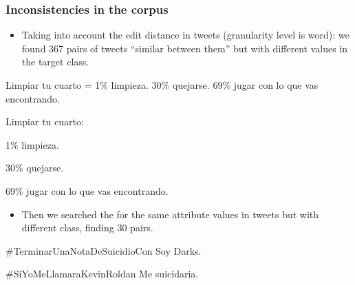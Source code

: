 \begin{frame}[allowframebreaks]
    \frametitle{Inconsistencies in the corpus}

    \begin{itemize}
        \item Taking into account the edit distance in tweets (granularity level is word): we found 367 pairs of tweets ``similar between them'' but with different values in the target class.
    \end{itemize}

    \begin{example}
        Limpiar tu cuarto = 1\% limpieza. 30\% quejarse. 69\% jugar con lo que vas encontrando.
    \end{example}

    \begin{example}
        Limpiar tu cuarto:

        1\% limpieza.

        30\% quejarse.

        69\% jugar con lo que vas encontrando.
    \end{example}

    \framebreak{}

    \begin{itemize}
        \item Then we searched the for the same attribute values in tweets but with different class, finding 30 pairs.
    \end{itemize}

    \begin{example}
        \#TerminarUnaNotaDeSuicidioCon Soy Darks.
    \end{example}

    \begin{example}
        \#SiYoMeLlamaraKevinRoldan Me suicidaria.
    \end{example}
\end{frame}

